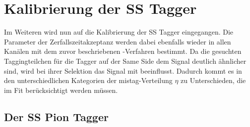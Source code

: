 \section{Kalibrierung der SS Tagger}

Im Weiteren wird nun auf die Kalibrierung der SS Tagger eingegangen. Die Parameter der Zerfallszeitakzeptanz werden dabei ebenfalls wieder in allen Kanälen mit dem zuvor beschriebenen \sPlot-Verfahren \cite{splot} bestimmt. Da die gesuchten Taggingteilchen für die Tagger auf der Same Side dem Signal deutlich ähnlicher sind, wird bei ihrer Selektion das Signal mit beeinflusst. Dadurch kommt es in den unterschiedlichen Kategorien der mistag-Verteilung $\eta$ zu Unterschieden, die im Fit berücksichtigt werden müssen.

\subsection{Der SS Pion Tagger}

